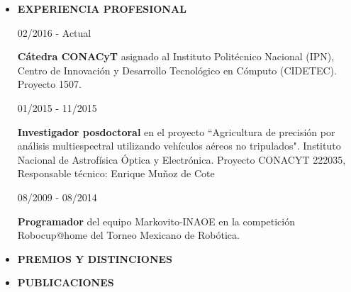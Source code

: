 \documentclass[10pt]{article}
\begin{document}
\begin{itemize}
\item {\bf EXPERIENCIA PROFESIONAL} \\

\begin{minipage}{1.5 in}
	02/2016 - Actual\\
\end{minipage}
\begin{minipage}{4.5in}
	\textbf{Cátedra CONACyT} asignado al Instituto Politécnico Nacional (IPN), Centro de Innovación y Desarrollo Tecnológico en Cómputo (CIDETEC). Proyecto 1507.\\ 
\end{minipage}


\begin{minipage}{1.5 in}
	01/2015 - 11/2015\\
\end{minipage}
\begin{minipage}{4.5in}
	\textbf{Investigador posdoctoral} en el proyecto ``Agricultura de precisión por análisis multiespectral
	utilizando vehículos aéreos no tripulados". Instituto Nacional de Astrofísica Óptica y Electrónica. Proyecto CONACYT 222035, Responsable técnico: Enrique Muñoz de Cote\\ 
\end{minipage}

\begin{minipage}{1.5 in}
08/2009 - 08/2014\\
\end{minipage}
\begin{minipage}{4.5in}
\textbf{Programador} del equipo Markovito-INAOE en la competición Robocup@home del Torneo Mexicano de Robótica.\\ 
\end{minipage}

\item{\bf PREMIOS Y DISTINCIONES} \\
 

\item {\bf PUBLICACIONES} \\


\end{itemize}
\end{document}
